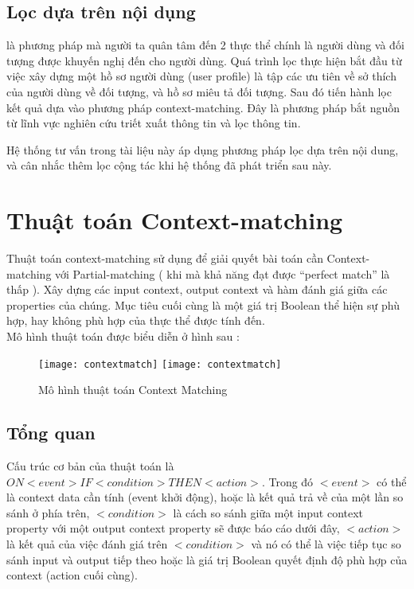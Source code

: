 \subsection{Lọc dựa trên nội dụng} là phương pháp mà người ta quân tâm đến 2 thực thể chính là người dùng và đối tượng được khuyến nghị đến cho người dùng. Quá trình lọc thực hiện bắt đầu từ việc xây dựng một hồ sơ người dùng (user profile) là tập các ưu tiên về sở thích của người dùng về đối tượng, và hồ sơ miêu tả đối tượng. Sau đó tiến hành lọc kết quả dựa vào phương pháp context-matching. Đây là phương pháp bắt nguồn từ lĩnh vực nghiên cứu triết xuất thông tin và lọc thông tin.

Hệ thống tư vấn trong tài liệu này áp dụng phương pháp lọc dựa trên nội dung, và cân nhắc thêm lọc cộng tác khi hệ thống đã phát triển sau này.

\section{Thuật toán Context-matching}
Thuật toán context-matching sử dụng để giải quyết bài toán cần Context-matching với Partial-matching ( khi mà khả năng đạt được “perfect match” là thấp ). Xây dựng các input context, output context và hàm đánh giá giữa các properties của chúng. Mục tiêu cuối cùng là một giá trị Boolean thể hiện sự phù hợp, hay không phù hợp của thực thể được tính đến.\\

Mô hình thuật toán được biểu diễn ở hình sau : 

\begin{figure}[!htbp]
  \begin{center}
    \ifpdf
      \texttt{[image: contextmatch]}
    \else
      \texttt{[image: contextmatch]}
    \fi
    \caption{Mô hình thuật toán Context Matching }
    \label{ContextMatching}
  \end{center}
\end{figure}
\subsection{Tổng quan}	
\label{ContextMatchingTheory}
Cấu trúc cơ bản của thuật toán là ${ON <event> IF <condition> THEN <action>}$. Trong đó $<event>$ có thể là context data cần tính (event khởi động), hoặc là kết quả trả về của một lần so sánh ở phía trên, $<condition>$ là cách so sánh giữa một input context property với một output context property sẽ được báo cáo dưới đây, $<action>$ là kết quả của việc đánh giá trên $<condition>$ và nó có thể là việc tiếp tục so sánh input và output tiếp theo hoặc là giá trị Boolean quyết định độ phù hợp của context (action cuối cùng).
